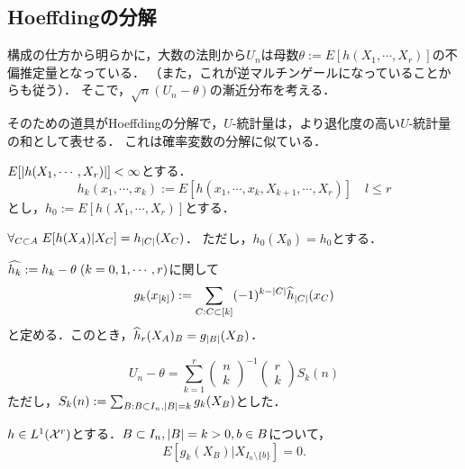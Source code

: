 \documentclass[uplatex,dvipdfmx]{jsreport}
\begin{document}
\subsection{Hoeffdingの分解}

\begin{tcolorbox}[colframe=ForestGreen, colback=ForestGreen!10!white,breakable,colbacktitle=ForestGreen!40!white,coltitle=black,fonttitle=\bfseries\sffamily,
title=]
    構成の仕方から明らかに，大数の法則から$U_n$は母数$\theta:=E[h(X_1,\cdots,X_r)]$の不偏推定量となっている．
    （また，これが逆マルチンゲールになっていることからも従う）．
    そこで，$\sqrt{n}(U_n-\theta)$の漸近分布を考える．

    そのための道具がHoeffdingの分解で，$U$-統計量は，より退化度の高い$U$-統計量の和として表せる．
    これは確率変数の分解に似ている．
\end{tcolorbox}

\begin{notation}
    $E[\lvert h(X_1,\cdots,X_r)\rvert]<\infty$とする．
    \[h_k(x_1,\cdots,x_k):=E[h(x_1,\cdots,x_k,X_{k+1},\cdots,X_r)]\quad l\le r\]
    とし，$h_0:=E[h(X_1,\cdots,X_r)]$とする．
\end{notation}

\begin{lemma}
    $\forall_{C\subset A}\;E[h(X_A)|X_C]=h_{\lvert C\rvert}(X_C)$．
    ただし，$h_0(X_{\emptyset})=h_0$とする．
\end{lemma}

\begin{definition}
    $\widehat{h_k}:=h_k-\theta\;(k=0,1,\cdots,r)$に関して
    \[g_k(x_{[k]}):=\sum_{C:C\subset[k]}(-1)^{k-\lvert C\rvert}\widehat{h}_{\lvert C\rvert}(x_C)\]
    と定める．このとき，$\widehat{h}_r(X_A)_B=g_{\lvert B\rvert}(X_B)$．
\end{definition}

\begin{lemma}[Hoeffdingの分解]
    \[U_n-\theta=\sum^r_{k=1}\begin{pmatrix}n\\k\end{pmatrix}^{-1}\begin{pmatrix}r\\k\end{pmatrix}S_k(n)\]
    ただし，$S_k(n):=\sum_{B:B\subset I_n,\lvert B\rvert=k}g_k(X_B)$とした．
\end{lemma}

\begin{lemma}[漸近分布の平均]
    $h\in L^1(\mathcal{X}^r)$とする．$B\subset I_n,\lvert B\rvert=k>0,b\in B$について，
    \[E[g_k(X_B)|X_{I_n\setminus\{b\}}]=0.\]
\end{lemma}
\end{document}
